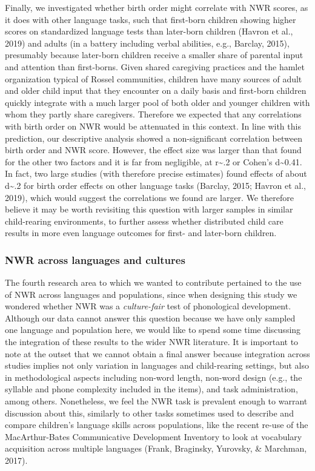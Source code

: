 \documentclass[
  american,
  ,man,floatsintext]{apa6}
\begin{document}
Finally, we investigated whether birth order might correlate with NWR scores, as it does with other language tasks, such that first-born children showing higher scores on standardized language tests than later-born children (Havron et al., 2019) and adults (in a battery including verbal abilities, e.g., Barclay, 2015), presumably because later-born children receive a smaller share of parental input and attention than first-borns. Given shared caregiving practices and the hamlet organization typical of Rossel communities, children have many sources of adult and older child input that they encounter on a daily basis and first-born children quickly integrate with a much larger pool of both older and younger children with whom they partly share caregivers. Therefore we expected that any correlations with birth order on NWR would be attenuated in this context. In line with this prediction, our descriptive analysis showed a non-significant correlation between birth order and NWR score. However, the effect size was larger than that found for the other two factors and it is far from negligible, at r\textasciitilde.2 or Cohen's d\textasciitilde0.41. In fact, two large studies (with therefore precise estimates) found effects of about d\textasciitilde.2 for birth order effects on other language tasks (Barclay, 2015; Havron et al., 2019), which would suggest the correlations we found are larger. We therefore believe it may be worth revisiting this question with larger samples in similar child-rearing environments, to further assess whether distributed child care results in more even language outcomes for first- and later-born children.

\hypertarget{nwr-across-languages-and-cultures}{%
\subsubsection{NWR across languages and cultures}\label{nwr-across-languages-and-cultures}}

The fourth research area to which we wanted to contribute pertained to the use of NWR across languages and populations, since when designing this study we wondered whether NWR was a \emph{culture-fair} test of phonological development. Although our data cannot answer this question because we have only sampled one language and population here, we would like to spend some time discussing the integration of these results to the wider NWR literature. It is important to note at the outset that we cannot obtain a final answer because integration across studies implies not only variation in languages and child-rearing settings, but also in methodological aspects including non-word length, non-word design (e.g., the syllable and phone complexity included in the items), and task administration, among others. Nonetheless, we feel the NWR task is prevalent enough to warrant discussion about this, similarly to other tasks sometimes used to describe and compare children's language skills across populations, like the recent re-use of the MacArthur-Bates Communicative Development Inventory to look at vocabulary acquisition across multiple languages (Frank, Braginsky, Yurovsky, \& Marchman, 2017).
\end{document}
